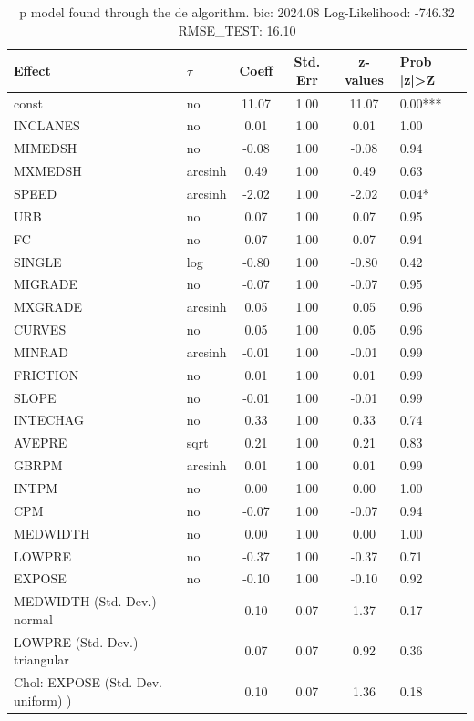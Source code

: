 \begin{table}
	\caption{p model found through the de algorithm. bic: 2024.08 Log-Likelihood: -746.32 RMSE_TEST: 16.10}
	\begin{center}
		\begin{tabular}{|l|l|c|c|c|l|}
			\hline
			Effect & $\tau$ & Coeff & Std. Err & z-values & Prob |z|>Z \\
			\hline
			const & no & 11.07 & 1.00 & 11.07 & 0.00*** \\
			\hline
			INCLANES & no & 0.01 & 1.00 & 0.01 & 1.00 \\
			\hline
			MIMEDSH & no & -0.08 & 1.00 & -0.08 & 0.94 \\
			\hline
			MXMEDSH & arcsinh & 0.49 & 1.00 & 0.49 & 0.63 \\
			\hline
			SPEED & arcsinh & -2.02 & 1.00 & -2.02 & 0.04* \\
			\hline
			URB & no & 0.07 & 1.00 & 0.07 & 0.95 \\
			\hline
			FC & no & 0.07 & 1.00 & 0.07 & 0.94 \\
			\hline
			SINGLE & log & -0.80 & 1.00 & -0.80 & 0.42 \\
			\hline
			MIGRADE & no & -0.07 & 1.00 & -0.07 & 0.95 \\
			\hline
			MXGRADE & arcsinh & 0.05 & 1.00 & 0.05 & 0.96 \\
			\hline
			CURVES & no & 0.05 & 1.00 & 0.05 & 0.96 \\
			\hline
			MINRAD & arcsinh & -0.01 & 1.00 & -0.01 & 0.99 \\
			\hline
			FRICTION & no & 0.01 & 1.00 & 0.01 & 0.99 \\
			\hline
			SLOPE & no & -0.01 & 1.00 & -0.01 & 0.99 \\
			\hline
			INTECHAG & no & 0.33 & 1.00 & 0.33 & 0.74 \\
			\hline
			AVEPRE & sqrt & 0.21 & 1.00 & 0.21 & 0.83 \\
			\hline
			GBRPM & arcsinh & 0.01 & 1.00 & 0.01 & 0.99 \\
			\hline
			INTPM & no & 0.00 & 1.00 & 0.00 & 1.00 \\
			\hline
			CPM & no & -0.07 & 1.00 & -0.07 & 0.94 \\
			\hline
			MEDWIDTH & no & 0.00 & 1.00 & 0.00 & 1.00 \\
			\hline
			LOWPRE & no & -0.37 & 1.00 & -0.37 & 0.71 \\
			\hline
			EXPOSE & no & -0.10 & 1.00 & -0.10 & 0.92 \\
			\hline
			MEDWIDTH (Std. Dev.) normal &  & 0.10 & 0.07 & 1.37 & 0.17 \\
			\hline
			LOWPRE (Std. Dev.) triangular &  & 0.07 & 0.07 & 0.92 & 0.36 \\
			\hline
			 Chol: EXPOSE (Std. Dev. uniform) ) &  & 0.10 & 0.07 & 1.36 & 0.18 \\
			\hline
		\end{tabular}
	\end{center}
\end{table}